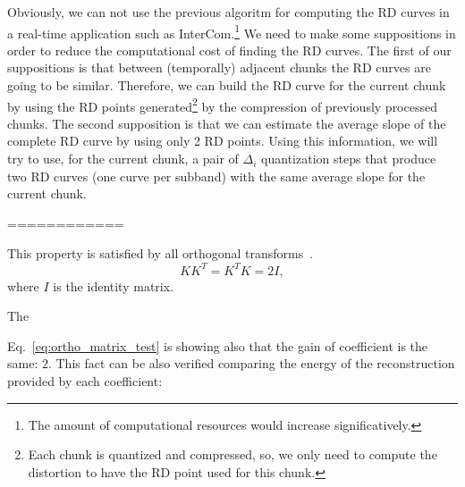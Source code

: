 Obviously, we can not use the previous algoritm for computing the RD
curves in a real-time application such as InterCom.\footnote{The
amount of computational resources would increase significatively.} We
need to make some suppositions in order to reduce the computational
cost of finding the RD curves. The first of our suppositions is that
between (temporally) adjacent chunks the RD curves are going to be
similar. Therefore, we can build the RD curve for the current chunk by
using the RD points generated\footnote{Each chunk is quantized and
compressed, so, we only need to compute the distortion to have the RD
point used for this chunk.} by the compression of previously processed
chunks. The second supposition is that we can estimate the average
slope of the complete RD curve by using only 2 RD points. Using this
information, we will try to use, for the current chunk, a pair of
$\Delta_i$ quantization steps that produce two RD curves (one curve
per subband) with the same average slope for the current chunk.

============

 This
property is satisfied by all orthogonal
transforms~\cite{sayood2017introduction}.
\begin{equation}
  KK^T=K^TK=2I,
  \label{eq:ortho_matrix_test}
\end{equation}
where $I$ is the identity matrix.

The 

Eq.~\ref{eq:ortho_matrix_test} is showing also that the gain of
coefficient is the same: $2$. This fact can be also verified comparing
the energy of the reconstruction provided by each coefficient:

